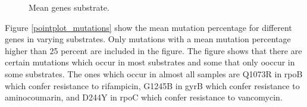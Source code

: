 \begin{figure}[h]
    \centering
    \caption{Mean genes substrate.}
    \label{both_mean_genes_substrate}
\end{figure}

Figure \ref{pointplot_mutations} show the mean mutation percentage for different genes in varying substrates. Only mutations with a mean mutation percentage higher than 25 percent are included in the figure. 
The figure shows that there are certain mutations which occur in most substrates and some that only ooccur in some substrates. The ones which occur in almost all samples are Q1073R in rpoB which confer resistance to rifampicin, G1245B in gyrB which confer resistance to aminocoumarin, and D244Y in rpoC which confer resistance to vancomycin.

